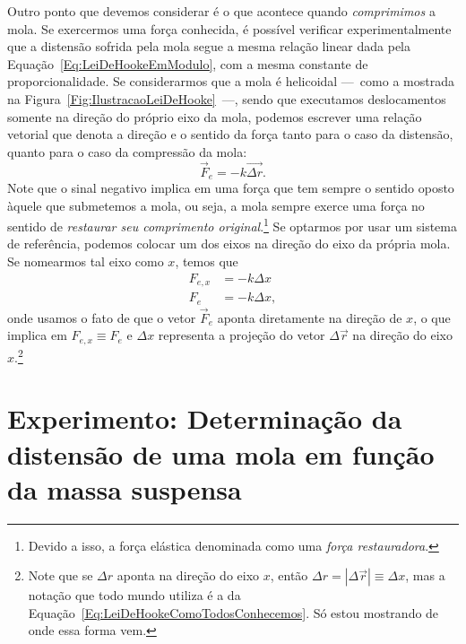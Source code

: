 Outro ponto que devemos considerar é o que acontece quando \emph{comprimimos} a mola. Se exercermos uma força conhecida, é possível verificar experimentalmente que a distensão sofrida pela mola segue a mesma relação linear dada pela Equação~\eqref{Eq:LeiDeHookeEmModulo}, com a mesma constante de proporcionalidade. Se considerarmos que a mola é helicoidal ---~como a mostrada na Figura~\ref{Fig:IlustracaoLeiDeHooke}~---, sendo que executamos deslocamentos somente na direção do próprio eixo da mola, podemos escrever uma relação vetorial que denota a direção e o sentido da força tanto para o caso da distensão, quanto para o caso da compressão da mola:
\begin{equation}
    \vec{F}_e = - k \vec{\Delta r}.
\end{equation}
%
Note que o sinal negativo implica em uma força que tem sempre o sentido oposto àquele que submetemos a mola, ou seja, a mola sempre exerce uma força no sentido de \emph{restaurar seu comprimento original}.\footnote{ Devido a isso, a força elástica denominada como uma \emph{força restauradora}.} Se optarmos por usar um sistema de referência, podemos colocar um dos eixos na direção do eixo da própria mola. Se nomearmos tal eixo como $x$, temos que
\begin{align}
    F_{e,x} &= -k \Delta x \\
    F_e &= -k \Delta x, \label{Eq:LeiDeHookeComoTodosConhecemos}
\end{align}
%
onde usamos o fato de que o vetor $\vec{F}_{e}$ aponta diretamente na direção de $x$, o que implica em $F_{e,x} \equiv F_e$ e $\Delta x$ representa a projeção do vetor $\Delta \vec{r}$ na direção do eixo $x$.\footnote{Note que se $\Delta r$ aponta na direção do eixo $x$, então $\Delta r = |\Delta \vec{r}| \equiv \Delta x$, mas a notação que todo mundo utiliza é a da Equação~\eqref{Eq:LeiDeHookeComoTodosConhecemos}. Só estou mostrando de onde essa forma vem.}


\section{Experimento: Determinação da distensão de uma mola em função da massa suspensa}

